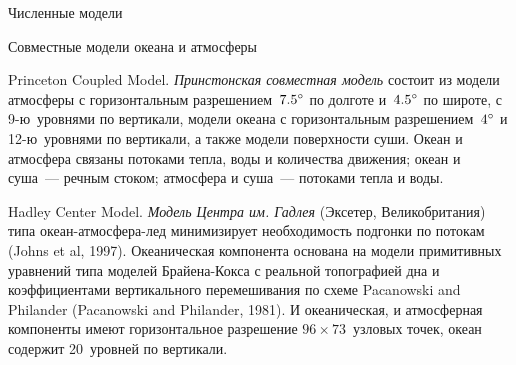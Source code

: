 \begin{chapter}{Численные модели}
\begin{section}{Совместные модели океана и атмосферы}
\begin{paragraph}{Princeton Coupled Model.}%
\emph{Принстонская совместная модель} состоит из модели атмосферы 
с горизонтальным разрешением~${7.5}^\circ$ по долготе и~${4.5}^\circ$ 
по широте, с 9-ю~уровнями по вертикали, модели океана
с горизонтальным разрешением~${4}^\circ$ и 12-ю~уровнями по вертикали, 
а также модели поверхности суши. Океан и атмосфера связаны потоками
тепла, воды и количества движения; океан и суша~--- речным стоком;
атмосфера и суша~--- потоками тепла и воды.
%
\end{paragraph}

\begin{paragraph}{Hadley Center Model.}%
\emph{Модель Центра им. Гадлея} (Эксетер, Великобритания) 
типа океан-атмосфера-лед минимизирует необходимость подгонки по 
потокам 
(Johns et al, 1997). Океаническая компонента основана на модели примитивных
уравнений типа моделей Брайена-Кокса с реальной топографией
дна и коэффициентами вертикального перемешивания%
по схеме Pacanowski and Philander (Pacanowski and Philander, 1981). 
И океаническая, и атмосферная компоненты имеют горизонтальное 
разрешение $96\times 73$~узловых точек, океан содержит
20~уровней по вертикали.
%


\end{paragraph}
\end{section}
\end{chapter}
